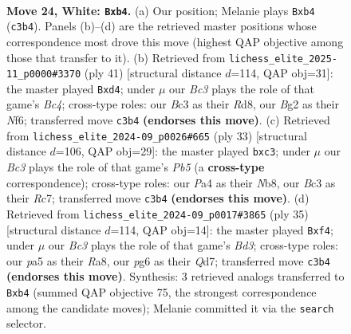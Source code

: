 \documentclass[11pt]{article}
\begin{document}
\begin{figure}[p]
\label{fig:thought-m44}
\end{figure}

\clearpage

\begin{figure}[p]\centering
\begin{subfigure}{0.46\textwidth}\centering
\resizebox{\linewidth}{!}{%
\newchessgame
\chessboard[
  setfen={2b2q2/5pkp/rp3np1/p7/Pn6/NPB3PN/5PBP/R3R1K1 w - - 0 24},
  showmover=false,
  pgfstyle=straightmove, color=movearrow, markmove={c3-b4}
]}
\caption{}
\end{subfigure}\hfill
\begin{subfigure}{0.46\textwidth}\centering
\resizebox{\linewidth}{!}{%
\newchessgame
\chessboard[
  setfen={r2r4/p3kp2/2p1pn1p/2b3p1/2PN4/1P4P1/PB3PKP/3R1R2 b - - 1 21},
  showmover=false,
  pgfstyle=straightmove, color=movearrow, markmove={c5-d4}
]}
\caption{}
\end{subfigure}
\\[4pt]
\begin{subfigure}{0.46\textwidth}\centering
\resizebox{\linewidth}{!}{%
\newchessgame
\chessboard[
  setfen={1n1r2k1/2r1bppp/p3bn2/8/1p6/1PN1P3/PB2BPPP/1QR3K1 b - - 1 17},
  showmover=false,
  pgfstyle=straightmove, color=movearrow, markmove={b4-c3}
]}
\caption{}
\end{subfigure}\hfill
\begin{subfigure}{0.46\textwidth}\centering
\resizebox{\linewidth}{!}{%
\newchessgame
\chessboard[
  setfen={r4r1k/3q2pp/2nb1n2/2p3N1/3p1N2/1Q4P1/PP3PKP/R1B1R3 b - - 9 18},
  showmover=false,
  pgfstyle=straightmove, color=movearrow, markmove={d6-f4}
]}
\caption{}
\end{subfigure}
\caption{\textbf{Move 24, White: \texttt{Bxb4}.} (a) Our position; Melanie plays \texttt{Bxb4} (\texttt{c3b4}). Panels (b)--(d) are the retrieved master positions whose correspondence most drove this move (highest QAP objective among those that transfer to it). (b) Retrieved from \texttt{lichess\_elite\_2025-11\_p0000\#3370} (ply 41) [structural distance $d$=114, QAP obj=31]: the master played \texttt{Bxd4}; under $\mu$ our \emph{Bc3} plays the role of that game's \emph{Bc4}; cross-type roles: our \emph{B}c3 as their \emph{R}d8, our \emph{B}g2 as their \emph{N}f6; transferred move \texttt{c3b4} \textbf{(endorses this move)}. (c) Retrieved from \texttt{lichess\_elite\_2024-09\_p0026\#665} (ply 33) [structural distance $d$=106, QAP obj=29]: the master played \texttt{bxc3}; under $\mu$ our \emph{Bc3} plays the role of that game's \emph{Pb5} (a \textbf{cross-type} correspondence); cross-type roles: our \emph{P}a4 as their \emph{N}b8, our \emph{B}c3 as their \emph{R}c7; transferred move \texttt{c3b4} \textbf{(endorses this move)}. (d) Retrieved from \texttt{lichess\_elite\_2024-09\_p0017\#3865} (ply 35) [structural distance $d$=114, QAP obj=14]: the master played \texttt{Bxf4}; under $\mu$ our \emph{Bc3} plays the role of that game's \emph{Bd3}; cross-type roles: our \emph{p}a5 as their \emph{R}a8, our \emph{p}g6 as their \emph{Q}d7; transferred move \texttt{c3b4} \textbf{(endorses this move)}. Synthesis: 3 retrieved analogs transferred to \texttt{Bxb4} (summed QAP objective 75, the strongest correspondence among the candidate moves); Melanie committed it via the \texttt{search} selector.}

\end{figure}
\end{document}
